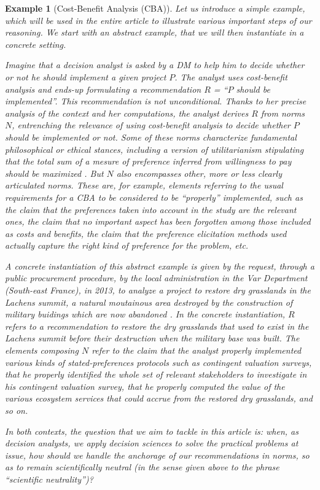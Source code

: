 \documentclass[preprint, french, english, 11pt, authoryear]{elsarticle}%
\newtheorem{example}{Example}
\begin{document}
\begin{example}[Cost-Benefit Analysis (CBA)]
Let us introduce a simple example, which will be used in the entire article to illustrate various important steps of our reasoning. %
We start with an abstract example, that we will then instantiate in a concrete setting.

Imagine that a decision analyst is asked by a \ac{DM} to help him to decide whether or not he should implement a given project $P$.
The analyst uses cost-benefit analysis \citep{layard_cost-benefit_1994} and ends-up formulating a recommendation $R$ = “$P$ should be implemented”.
This recommendation is not unconditional. Thanks to her precise analysis of the context and her computations, the analyst derives $R$ from norms $N$, entrenching the relevance of using cost-benefit analysis to decide whether $P$ should be implemented or not. Some of these norms characterize fundamental philosophical or ethical stances, including a version of utilitarianism stipulating that the total sum of a mesure of preference inferred from willingness to pay should be maximized \citep{meinard_ethical_2016}. 
But $N$ also encompasses other, more or less clearly articulated norms. These are, for example, elements referring to the usual requirements for a CBA to be considered to be ``properly'' implemented, such as the claim that the preferences taken into account in the study are the relevant ones, the claim that no important aspect has been forgotten among those included as costs and benefits, the claim that the preference elicitation methods used actually capture the right kind of preference for the problem, etc.

A concrete instantiation of this abstract example is given by the request, through a public procurement procedure, by the local administration in the Var Department (South-east France), in 2013, to analyze a project to restore dry grasslands in the Lachens summit, a natural moutainous area destroyed by the construction of military buidings which are now abandoned \citep{meinard_etude_2015}.
In the concrete instantiation, $R$ refers to a recommendation to restore the dry grasslands that used to exist in the Lachens summit before their destruction when the military base was built. 
The elements composing $N$ refer to the claim that the analyst properly implemented various kinds of stated-preferences protocols such as contingent valuation surveys, that he properly identified the whole set of relevant stakeholders to investigate in his contingent valuation survey, that he properly computed the value of the various ecosystem services that could accrue from the restored dry grasslands, and so on.

In both contexts, the question that we aim to tackle in this article is: when, as decision analysts, we apply decision sciences to solve the practical problems at issue, how should we handle the anchorage of our recommendations in norms, so as to remain scientifically neutral (in the sense given above to the phrase ``scientific neutrality'')? 
\end{example}
\end{document}
